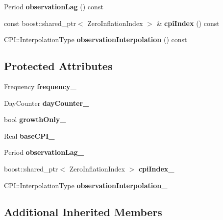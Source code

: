 \begin{DoxyCompactItemize}
\item 
Period {\bfseries observation\+Lag} () const \label{class_quant_lib_1_1_c_p_i_bond_a30c8aedae78085af68b5ff9e2f3da51a}

\item 
const boost\+::shared\+\_\+ptr$<$ Zero\+Inflation\+Index $>$ \& {\bfseries cpi\+Index} () const \label{class_quant_lib_1_1_c_p_i_bond_a155b84acc92386ac37503fcdd744fde9}

\item 
C\+P\+I\+::\+Interpolation\+Type {\bfseries observation\+Interpolation} () const \label{class_quant_lib_1_1_c_p_i_bond_a1f9fc6a30fa840086201673ebd7b2427}

\end{DoxyCompactItemize}
\subsection*{Protected Attributes}
\begin{DoxyCompactItemize}
\item 
Frequency {\bfseries frequency\+\_\+}\label{class_quant_lib_1_1_c_p_i_bond_a74c9b892002e821da2850a28a52ca83f}

\item 
Day\+Counter {\bfseries day\+Counter\+\_\+}\label{class_quant_lib_1_1_c_p_i_bond_af30a377bfbd0ee0c273012b7cf967a79}

\item 
bool {\bfseries growth\+Only\+\_\+}\label{class_quant_lib_1_1_c_p_i_bond_ab8e92cfae8467ef0fa0a9b7d1de92fbc}

\item 
Real {\bfseries base\+C\+P\+I\+\_\+}\label{class_quant_lib_1_1_c_p_i_bond_a4ac264515f8d656ee186886176ec28fb}

\item 
Period {\bfseries observation\+Lag\+\_\+}\label{class_quant_lib_1_1_c_p_i_bond_ad16bd611a56eccea9ea07348c2ceea00}

\item 
boost\+::shared\+\_\+ptr$<$ Zero\+Inflation\+Index $>$ {\bfseries cpi\+Index\+\_\+}\label{class_quant_lib_1_1_c_p_i_bond_a82a7237059dd368bfe9e958b3041373d}

\item 
C\+P\+I\+::\+Interpolation\+Type {\bfseries observation\+Interpolation\+\_\+}\label{class_quant_lib_1_1_c_p_i_bond_a0946bb2404b704e03817b196853f86f6}

\end{DoxyCompactItemize}
\subsection*{Additional Inherited Members}



